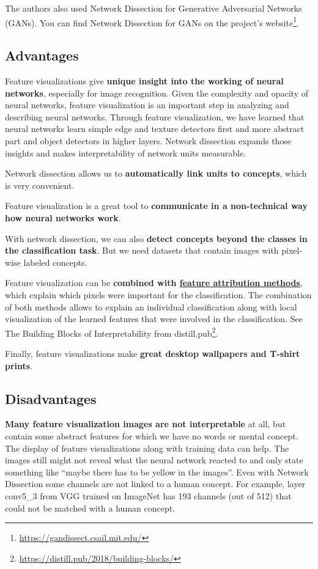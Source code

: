 \documentclass[
  10pt,
]{scrbook}
\renewcommand{\href}[2]{#2\footnote{\url{#1}}}
\begin{document}
The authors also used Network Dissection for Generative Adversarial Networks (GANs).
You can find Network Dissection for GANs on \href{https://gandissect.csail.mit.edu/}{the project's website}.

\hypertarget{advantages-18}{%
\subsection{Advantages}\label{advantages-18}}

Feature visualizations give \textbf{unique insight into the working of neural networks}, especially for image recognition.
Given the complexity and opacity of neural networks, feature visualization is an important step in analyzing and describing neural networks.
Through feature visualization, we have learned that neural networks learn simple edge and texture detectors first and more abstract part and object detectors in higher layers.
Network dissection expands those insights and makes interpretability of network units measurable.

Network dissection allows us to \textbf{automatically link units to concepts}, which is very convenient.

Feature visualization is a great tool to \textbf{communicate in a non-technical way how neural networks work}.

With network dissection, we can also \textbf{detect concepts beyond the classes in the classification task}.
But we need datasets that contain images with pixel-wise labeled concepts.

Feature visualization can be \textbf{combined with \protect\hyperlink{pixel-attribution}{feature attribution methods}}, which explain which pixels were important for the classification.
The combination of both methods allows to explain an individual classification along with local visualization of the learned features that were involved in the classification.
See \href{https://distill.pub/2018/building-blocks/}{The Building Blocks of Interpretability from distill.pub}.

Finally, feature visualizations make \textbf{great desktop wallpapers and T-shirt prints}.

\hypertarget{disadvantages-18}{%
\subsection{Disadvantages}\label{disadvantages-18}}

\textbf{Many feature visualization images are not interpretable} at all, but contain some abstract features for which we have no words or mental concept.
The display of feature visualizations along with training data can help.
The images still might not reveal what the neural network reacted to and only state something like ``maybe there has to be yellow in the images''.
Even with Network Dissection some channels are not linked to a human concept.
For example, layer conv5\_3 from VGG trained on ImageNet has 193 channels (out of 512) that could not be matched with a human concept.
\end{document}
